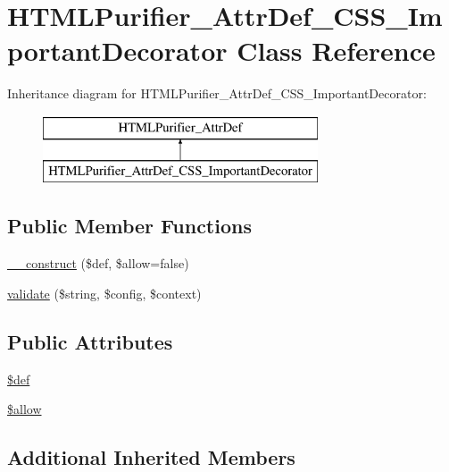 \hypertarget{classHTMLPurifier__AttrDef__CSS__ImportantDecorator}{\section{H\+T\+M\+L\+Purifier\+\_\+\+Attr\+Def\+\_\+\+C\+S\+S\+\_\+\+Important\+Decorator Class Reference}
\label{classHTMLPurifier__AttrDef__CSS__ImportantDecorator}
}
Inheritance diagram for H\+T\+M\+L\+Purifier\+\_\+\+Attr\+Def\+\_\+\+C\+S\+S\+\_\+\+Important\+Decorator\+:\begin{figure}[H]
\begin{center}
\leavevmode
\includegraphics[height=2.000000cm]{classHTMLPurifier__AttrDef__CSS__ImportantDecorator}
\end{center}
\end{figure}
\subsection*{Public Member Functions}
\begin{DoxyCompactItemize}
\item 
\hyperlink{classHTMLPurifier__AttrDef__CSS__ImportantDecorator_a088f3cb9613bb72b5b8b62b80c8077ea}{\+\_\+\+\_\+construct} (\$def, \$allow=false)
\item 
\hyperlink{classHTMLPurifier__AttrDef__CSS__ImportantDecorator_a8a9cd2da389c44090b9946f353812d31}{validate} (\$string, \$config, \$context)
\end{DoxyCompactItemize}
\subsection*{Public Attributes}
\begin{DoxyCompactItemize}
\item 
\hyperlink{classHTMLPurifier__AttrDef__CSS__ImportantDecorator_a7c9714eb47d21aa5f443f1cb8e06dbca}{\$def}
\item 
\hyperlink{classHTMLPurifier__AttrDef__CSS__ImportantDecorator_aa42484aa059d225e808cb23d1488ea7c}{\$allow}
\end{DoxyCompactItemize}
\subsection*{Additional Inherited Members}


